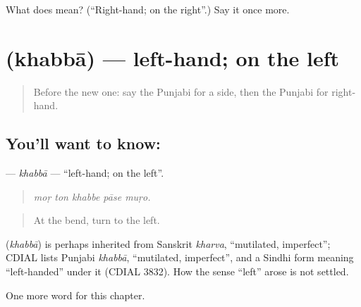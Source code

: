 \begin{tcolorbox}[breakable,colback=teal!4,colframe=teal!35!black,title={Before you move on}]
What does  mean? (\textquotedblleft{}Right-hand; on the right\textquotedblright{}.) Say it once more.
\end{tcolorbox}
\section[\texorpdfstring{\pa{ਖੱਬਾ} (khabbā)}{ਖੱਬਾ (khabbā)}]{ (khabbā) — left-hand; on the left}

\label{lesson:PA-C263-khabba}



\begin{quote}
Before the new one: say the Punjabi for a side, then the Punjabi for right-hand.
\end{quote}

\subsection*{You'll want to know: }
\textbf{} — \emph{khabbā} — \textquotedblleft{}left-hand; on the left\textquotedblright{}.

\begin{quote}
    
\end{quote}

\begin{quote}
\emph{moṛ ton khabbe pāse muṛo.}
\end{quote}

\begin{quote}
At the bend, turn to the left.
\end{quote}

\begin{cousinweb}
\textbf{} (\emph{khabbā}) is perhaps inherited from Sanskrit \emph{kharva}, \textquotedblleft{}mutilated, imperfect\textquotedblright{}; CDIAL lists Punjabi \emph{khabbā}, \textquotedblleft{}mutilated, imperfect\textquotedblright{}, and a Sindhi form meaning \textquotedblleft{}left-handed\textquotedblright{} under it (CDIAL 3832). How the sense \textquotedblleft{}left\textquotedblright{} arose is not settled.
\end{cousinweb}

\begin{grammarlens}[title={What you've built}]
One more word for this chapter.
\end{grammarlens}

